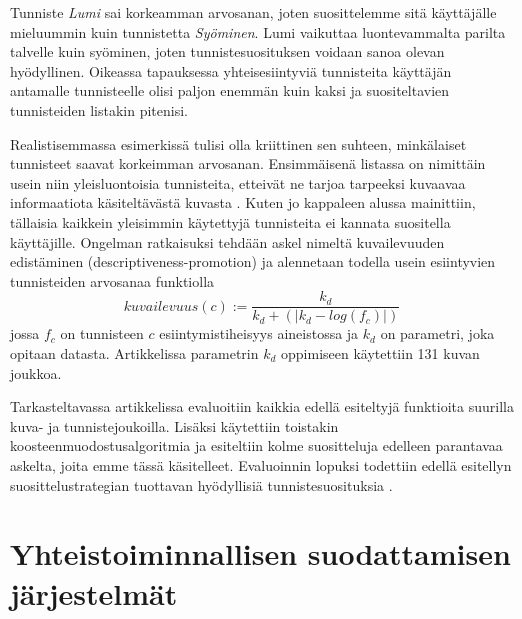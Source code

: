 \documentclass[12pt,finnish]{tktltiki2}
\theoremstyle{definition}
\theoremstyle{remark}
\begin{document}
Tunniste \textit{Lumi} sai korkeamman arvosanan, joten suosittelemme sitä käyttäjälle mieluummin kuin tunnistetta \textit{Syöminen}. Lumi vaikuttaa luontevammalta parilta talvelle kuin syöminen, joten tunnistesuosituksen voidaan sanoa olevan hyödyllinen. Oikeassa tapauksessa yhteisesiintyviä tunnisteita käyttäjän antamalle tunnisteelle olisi paljon enemmän kuin kaksi ja suositeltavien tunnisteiden listakin pitenisi.

Realistisemmassa esimerkissä tulisi olla kriittinen sen suhteen, minkälaiset tunnisteet saavat korkeimman arvosanan. Ensimmäisenä listassa on nimittäin usein niin yleisluontoisia tunnisteita, etteivät ne tarjoa tarpeeksi kuvaavaa informaatiota käsiteltävästä kuvasta \cite{Sigurbjornsson:2008:FTR:1367497.1367542}. Kuten jo kappaleen alussa mainittiin, tällaisia kaikkein yleisimmin käytettyjä tunnisteita ei kannata suositella käyttäjille. Ongelman ratkaisuksi tehdään askel nimeltä kuvailevuuden edistäminen (descriptiveness-promotion) ja alennetaan todella usein esiintyvien tunnisteiden arvosanaa funktiolla
\begin{displaymath}
kuvailevuus(c) := \frac{k_d}{k_d + (|k_d -log(f_c)|)}
\end{displaymath}
jossa $f_c$ on tunnisteen $c$ esiintymistiheisyys aineistossa ja $k_d$ on parametri, joka opitaan datasta. Artikkelissa parametrin $k_d$ oppimiseen käytettiin 131 kuvan joukkoa.

Tarkasteltavassa artikkelissa evaluoitiin kaikkia edellä esiteltyjä funktioita suurilla kuva- ja tunnistejoukoilla. Lisäksi käytettiin toistakin koosteenmuodostusalgoritmia ja esiteltiin kolme suositteluja edelleen parantavaa askelta, joita emme tässä käsitelleet. Evaluoinnin lopuksi todettiin edellä esitellyn suosittelustrategian tuottavan hyödyllisiä tunnistesuosituksia \cite{Sigurbjornsson:2008:FTR:1367497.1367542}.



\section{Yhteistoiminnallisen suodattamisen järjestelmät}
\end{document}
